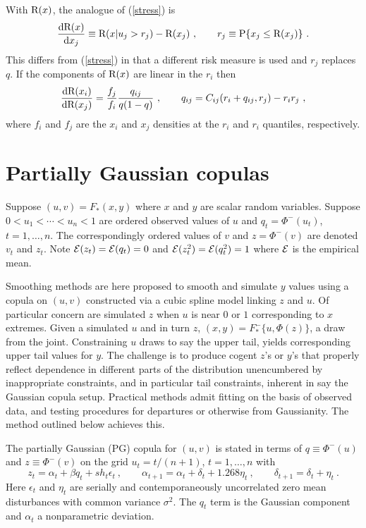 \documentclass[authoryear]{elsarticle}
\newcommand{\p}{\mathrm{P}}
\newcommand{\eps}{\epsilon}
\newcommand{\Ex}{{\cal E}}
\newcommand{\de}{\mathrm{d}}
\newcommand{\eref}[1]{(\ref{#1})}
\newcommand{\cq}{\ , \qquad}
\newcommand{\be}[1]{\begin{equation}\label{#1}}
\newcommand{\ee}{\end{equation}}
\begin{document}
With $\mathrm{R}(x)$, the analogue of \eref{stress} is 
\be{stress2}
\frac{\de\r(x)}{\de x_j} \equiv \r(x|u_j>r_j) - \r(x_j)\cq r_j\equiv\p\{x_j\le\r(x_j)\} \ .
\ee
This differs from \eref{stress}  in that a different risk measure is used and  $r_j$ replaces $q$.   If  the components of $\mathrm{R}(x)$ are linear in the $r_i$ then
\be{implicit2}
\frac{\de\r(x_i)}{\de\r(x_j)} =  
\frac{f_j}{f_i} 
 \frac{q_{ij}}{q(1-q)}\cq q_{ij}=C_{ij}(r_i+q_{ij},r_j) - r_ir_j\ ,
\ee
where $f_i$ and $f_j$ are the $x_i$ and $x_j$ densities at the $r_i$ and $r_i$ quantiles, respectively. 

\section{Partially Gaussian copulas}

Suppose $(u,v)=F_*(x,y)$  where $x$ and $y$ are scalar random variables.    Suppose $0<u_1<\cdots<u_n<1$  are   ordered observed values of $u$ and $q_t=\Phi^-(u_t)$, $t=1,\ldots,n$.  The correspondingly ordered values of $v$ and $z=\Phi^-(v)$ are denoted $v_t$ and $z_t$.  Note $\Ex(z_t)=\Ex(q_t)=0$ and $\Ex(z^2_t)=\Ex(q^2_t)=1$ where $\Ex$  is the empirical mean. 

Smoothing methods are here proposed to smooth and simulate $y$ values  using a copula on $(u,v)$ constructed via    a cubic spline model linking $z$ and $u$.   Of particular concern are simulated $z$ when $u$ is  near $0$ or $1$ corresponding to  $x$ extremes.    Given a simulated $u$ and in turn $z$, $(x,y)=F^-_*\{u,\Phi(z)\}$, a draw from the joint.  Constraining $u$ draws to say the upper tail, yields corresponding upper tail values for $y$.   The challenge is to produce cogent $z$'s or $y$'s that properly reflect dependence in different parts of the distribution unencumbered by inappropriate constraints, and in particular tail constraints, inherent in say the Gaussian copula setup.    Practical methods admit fitting on the basis of observed data, and testing procedures for  departures or otherwise from Gaussianity.   The method outlined below achieves this.

The partially Gaussian  (PG) copula for $(u,v)$ is stated in terms of  $q\equiv\Phi^-(u)$ and $z\equiv\Phi^-(v)$ on the grid   $u_t=t/(n+1)$, $t=1,\ldots,n$ with 
\be{cusp}
z_t = \alpha_t+\beta q_t+ sh_t\eps_t\cq \alpha_{t+1}=\alpha_t +\delta_t+1.268\eta_t\cq \delta_{t+1}=\delta_t+\eta_t\ .
\ee
Here $\eps_t$ and $\eta_t$ are serially and contemporaneously uncorrelated zero mean disturbances with common variance $\sigma^2$.  The  $q_t$ term is the   Gaussian component and  $\alpha_t$ a nonparametric deviation.   
\end{document}
